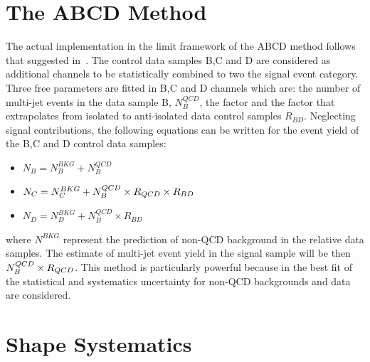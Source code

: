 \section{The ABCD Method }
The actual implementation in the limit framework of the ABCD method follows that suggested in~\cite{ABCD}.
The control data samples B,C and D are considered as additional channels to be statistically combined
to two the signal event category. Three free parameters are fitted in B,C and D channels which are: the 
number of multi-jet events in the data sample B, $N_{B}^{QCD}$, the factor \rqcd 
and the factor that extrapolates from isolated to anti-isolated data control samples $R_{BD}$. Neglecting signal contributions, 
the following equations can be written for the event yield of the B,C and D control data samples:
\begin{itemize}
\item[] $N_{B} = N_{B}^{BKG} + N_{B}^{QCD}$
\item[] $N_{C} = N_{C}^{BKG} +  N_{B}^{QCD} \times R_{QCD} \times R_{BD} $
\item[] $N_{D} =  N_{D}^{BKG} + N_{B}^{QCD} \times  R_{BD} $
\end{itemize}
where $N^{BKG}$ represent the prediction of  non-QCD background in the relative data samples.
The estimate of multi-jet event yield in the signal sample will be then $ N_{B}^{QCD} \times R_{QCD} $. This method is 
particularly powerful because in the best fit of \rqcd the statistical 
and systematics uncertainty for non-QCD backgrounds and data are considered.

\clearpage

\section{Shape Systematics} \label{appendix:shapeNPs}

